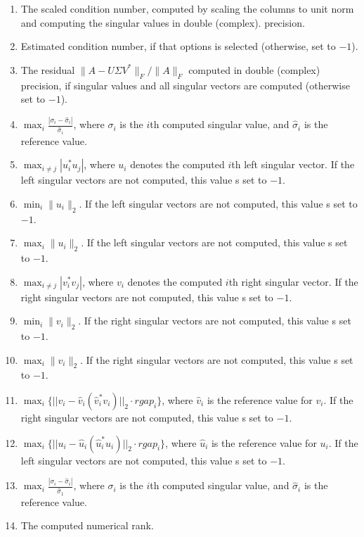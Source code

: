 \documentclass[12pt, a4paper, final]{article}
\numberwithin{equation}{section}
\begin{document}
\begin{enumerate}
\item The scaled condition number, computed by scaling the columns to unit norm and computing the singular values in double (complex).
 precision.	
 \item Estimated condition number, if that options is selected (otherwise, set to $-1$).
 \item The residual $\|A - U\Sigma V^*\|_F / \|A\|_F$ computed in double (complex) precision, if singular values and all singular vectors are computed (otherwise set to $-1$).
 \item $\max_i \frac{|\sigma_i - \widehat{\sigma}_i|}{\widehat{\sigma}_i}$, where $\sigma_i$ is the $i$th computed singular value, and $\widehat{\sigma}_i$ is the reference value.
 \item $\max_{i\neq j} |u_i^* u_j|$, where $u_i$ denotes the computed $i$th left singular vector. If the left singular vectors are not computed, this value s set to $-1$.
 \item $\min_i \|u_i\|_2$. If the left singular vectors are not computed, this value s set to $-1$.
 \item $\max_i \|u_i\|_2$. If the left singular vectors are not computed, this value s set to $-1$.
 \item $\max_{i\neq j} |v_i^* v_j|$, where $v_i$ denotes the computed $i$th right singular vector. If the right singular vectors are not computed, this value s set to $-1$.
 \item $\min_i \|v_i\|_2$. If the right singular vectors are not computed, this value s set to $-1$.
 \item $\max_i \|v_i\|_2$. If the right singular vectors are not computed, this value s set to $-1$.
 \item $\max_i \{ || v_i - \widehat{v}_i (\widehat{v}_i^* v_i)||_2 \cdot  rgap_i \}$, where $\widehat{v}_i$ is the reference value for $v_i$. If the right singular vectors are not computed, this value s set to $-1$.
 \item $\max_i \{ || u_i - \widehat{u}_i (\widehat{u}_i^* u_i)||_2 \cdot  rgap_i \}$, where $\widehat{u}_i$ is the reference value for $u_i$. If the left singular vectors are not computed, this value s set to $-1$.
 \item $\max_i \frac{|\sigma_i - \widehat{\sigma}_i|}{\widehat{\sigma}_1}$, where $\sigma_i$ is the $i$th computed singular value, and $\widehat{\sigma}_i$ is the reference value.
 \item The computed numerical rank. 
\end{enumerate} 
\end{document}

